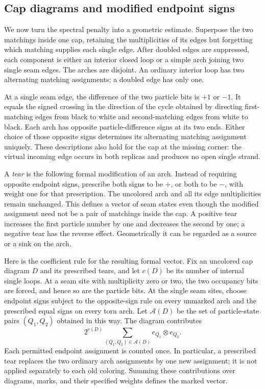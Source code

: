 \subsection{Cap diagrams and modified endpoint signs}

We now turn the spectral penalty into a geometric estimate.  Superpose
the two matchings inside one cap, retaining the multiplicities of its
edges but forgetting which matching supplies each single edge.  After
doubled edges are suppressed, each component is either an interior
closed loop or a simple arch joining two single seam edges.  The arches
are disjoint.  An ordinary interior loop has two alternating matching
assignments; a doubled edge has only one.

At a single seam edge, the difference of the two particle bits is $+1$
or $-1$.  It equals the signed crossing in the direction of the cycle
obtained by directing first-matching edges from black to white and
second-matching edges from white to black.  Each arch has opposite
particle-difference signs at its two ends.  Either choice of those
opposite signs determines its alternating matching assignment uniquely.
These descriptions also hold for the cap at the missing corner: the
virtual incoming edge occurs in both replicas and produces no open
single strand.

A \emph{tear} is the following formal modification of an arch.  Instead
of requiring opposite endpoint signs, prescribe both signs to be $+$,
or both to be $-$, with weight one for that prescription.  The uncolored
arch and all its edge multiplicities remain unchanged.  This defines a
vector of seam states even though the modified assignment need not be
a pair of matchings inside the cap.  A positive tear increases the
first particle number by one and decreases the second by one; a negative
tear has the reverse effect.  Geometrically it can be regarded as a
source or a sink on the arch.

Here is the coefficient rule for the resulting formal vector.  Fix an
uncolored cap diagram $D$ and its prescribed tears, and let $c(D)$ be
its number of internal single loops.  At a seam site with multiplicity
zero or two, the two occupancy bits are forced, and hence so are the
particle bits.  At the single seam sites, choose endpoint signs subject
to the opposite-sign rule on every unmarked arch and the prescribed
equal signs on every torn arch.  Let $\mathcal A(D)$ be the set of
particle-state pairs $(Q_1,Q_2)$ obtained in this way.  The diagram
contributes
\[
 2^{c(D)}\sum_{(Q_1,Q_2)\in\mathcal A(D)}
           e_{Q_1}\otimes e_{Q_2}.
\]
Each permitted endpoint assignment is counted once.  In particular,
a prescribed tear replaces the two ordinary arch assignments by one
new assignment; it is not applied separately to each old coloring.
Summing these contributions over diagrams, marks, and their specified
weights defines the marked vector.

